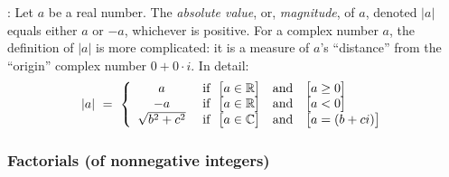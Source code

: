 :
%
Let $a$ be a real number.  The {\it absolute value}, or, {\it
  magnitude}, of $a$, denoted $|a|$ equals either $a$ or $-a$,
whichever is positive.  For a complex number $a$, the definition of
$|a|$ is more complicated: it is a measure of $a$'s ``distance'' from
the ``origin'' complex number $0 + 0 \cdot i$.  In detail:
\[
|a| \ = \ \left\{
\begin{array}{cl}
a & \mbox{ if } \ \big[a \in \mathbb{R} \big] \ \ \mbox{ and } \ \ \big[a \geq
  0\big] \\
-a & \mbox{ if } \ \big[a \in \mathbb{R}\big] \ \ \mbox{ and } \ \ \big[a <
  0\big] \\
\sqrt{b^2 + c^2} &  \mbox{ if } \ \big[a \in \mathbb{C}\big]  \ \ \mbox{ and }
     \ \ \big[a = (b+ci)\big]
\end{array}
\right.
\]

\subsubsection{Factorials (of nonnegative integers)}

